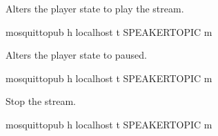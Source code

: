 \documentclass[letterpaper,10pt,english]{sphinxmanual}
\begin{document}
\begin{fulllineitems}

\pysigstartsignatures
{}
\pysigstopsignatures

\begin{fulllineitems}

\pysigstartsignatures
{}
\pysigstopsignatures
\sphinxAtStartPar
Alters the player state to play the stream.

\begin{sphinxVerbatim}[commandchars=\\\{\}]
mosquitto\PYGZus{}pub \PYGZhy{}h localhost \PYGZhy{}t \PYGZpc{}SPEAKER\PYGZus{}TOPIC \PYGZhy{}m 
\end{sphinxVerbatim}

\end{fulllineitems}



\begin{fulllineitems}

\pysigstartsignatures
{}
\pysigstopsignatures
\sphinxAtStartPar
Alters the player state to paused.

\begin{sphinxVerbatim}[commandchars=\\\{\}]
mosquitto\PYGZus{}pub \PYGZhy{}h localhost \PYGZhy{}t \PYGZpc{}SPEAKER\PYGZus{}TOPIC \PYGZhy{}m 
\end{sphinxVerbatim}

\end{fulllineitems}



\begin{fulllineitems}

\pysigstartsignatures
{}
\pysigstopsignatures
\sphinxAtStartPar
Stop the stream.

\begin{sphinxVerbatim}[commandchars=\\\{\}]
mosquitto\PYGZus{}pub \PYGZhy{}h localhost \PYGZhy{}t \PYGZpc{}SPEAKER\PYGZus{}TOPIC \PYGZhy{}m 
\end{sphinxVerbatim}

\end{fulllineitems}




\end{fulllineitems}
\end{document}

